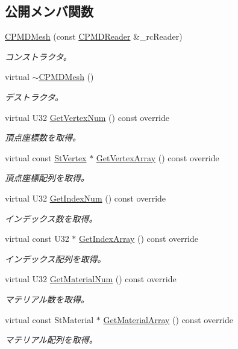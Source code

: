 \subsection*{公開メンバ関数}
\begin{DoxyCompactItemize}
\item 
\hyperlink{class_c_p_m_d_mesh_aa6c81a795b0497efecf17128385f853a}{C\+P\+M\+D\+Mesh} (const \hyperlink{class_c_p_m_d_reader}{C\+P\+M\+D\+Reader} \&\+\_\+rc\+Reader)
\begin{DoxyCompactList}\small\item\em コンストラクタ。 \end{DoxyCompactList}\item 
virtual \hyperlink{class_c_p_m_d_mesh_a5cd7433c40e72a8ac468e8fc248d49ce}{$\sim$\+C\+P\+M\+D\+Mesh} ()
\begin{DoxyCompactList}\small\item\em デストラクタ。 \end{DoxyCompactList}\item 
virtual U32 \hyperlink{class_c_p_m_d_mesh_a99a0e4d3664fae495cfe216170294aab}{Get\+Vertex\+Num} () const  override
\begin{DoxyCompactList}\small\item\em 頂点座標数を取得。 \end{DoxyCompactList}\item 
virtual const \hyperlink{struct_i_mesh_1_1_st_vertex}{St\+Vertex} $\ast$ \hyperlink{class_c_p_m_d_mesh_aa2b096b1102286fec5d8ea7cc381bb55}{Get\+Vertex\+Array} () const  override
\begin{DoxyCompactList}\small\item\em 頂点座標配列を取得。 \end{DoxyCompactList}\item 
virtual U32 \hyperlink{class_c_p_m_d_mesh_a0127281ef228e27dd6232069c5ffd164}{Get\+Index\+Num} () const  override
\begin{DoxyCompactList}\small\item\em インデックス数を取得。 \end{DoxyCompactList}\item 
virtual const U32 $\ast$ \hyperlink{class_c_p_m_d_mesh_ab2b12b75b3ed1ed3017cff8d52f1677b}{Get\+Index\+Array} () const  override
\begin{DoxyCompactList}\small\item\em インデックス配列を取得。 \end{DoxyCompactList}\item 
virtual U32 \hyperlink{class_c_p_m_d_mesh_a3dc32e47f692de7cc2c998b65a416c6d}{Get\+Material\+Num} () const  override
\begin{DoxyCompactList}\small\item\em マテリアル数を取得。 \end{DoxyCompactList}\item 
virtual const St\+Material $\ast$ \hyperlink{class_c_p_m_d_mesh_a8b6ba1255586f2387442ec24f92ade55}{Get\+Material\+Array} () const  override
\begin{DoxyCompactList}\small\item\em マテリアル配列を取得。 \end{DoxyCompactList}\end{DoxyCompactItemize}
